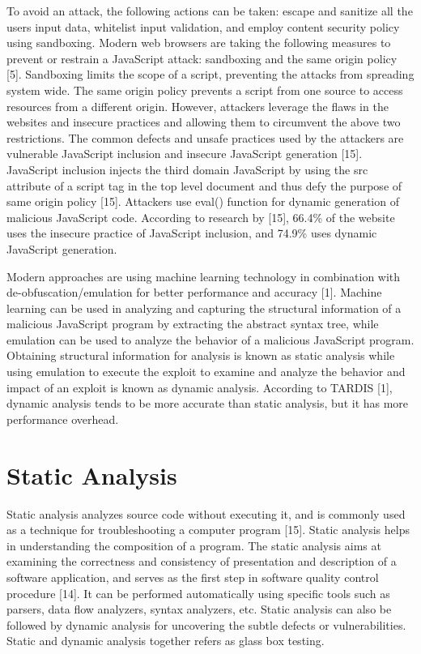 To avoid an attack, the following actions can be taken: escape and sanitize all the users input data, whitelist input validation, and employ content security policy using sandboxing. Modern web browsers are taking the following measures to prevent or restrain a JavaScript attack: sandboxing and the same origin policy [5]. Sandboxing limits the scope of a script, preventing the attacks from spreading system wide. The same origin policy prevents a script from one source to access resources from a different origin. However, attackers leverage the flaws in the websites and insecure practices and allowing them to circumvent the above two restrictions. The common defects and unsafe practices used by the attackers are vulnerable JavaScript inclusion and insecure JavaScript generation [15]. JavaScript inclusion injects the third domain JavaScript by using the src attribute of a script tag in the top level document and thus defy the purpose of same origin policy [15]. Attackers use eval() function for dynamic generation of malicious JavaScript code. According to research by [15], 66.4\% of the website uses the insecure practice of JavaScript inclusion, and 74.9\% uses dynamic JavaScript generation.

Modern approaches are using machine learning technology in combination with de-obfuscation/emulation for better performance and accuracy [1]. Machine learning can be used in analyzing and capturing the structural information of a malicious JavaScript program by extracting the abstract syntax tree, while emulation can be used to analyze the behavior of a malicious JavaScript program. Obtaining structural information for analysis is known as static analysis while using emulation to execute the exploit to examine and analyze the behavior and impact of an exploit is known as dynamic analysis. According to TARDIS [1], dynamic analysis tends to be more accurate than static analysis, but it has more performance overhead.  

\section{Static Analysis}

Static analysis analyzes source code without executing it, and is commonly used as a technique for troubleshooting a computer program [15]. Static analysis helps in understanding the composition of a program. The static analysis aims at examining the correctness and consistency of presentation and description of a software application, and serves as the first step in software quality control procedure [14]. It can be performed automatically using specific tools such as parsers, data flow analyzers, syntax analyzers, etc. Static analysis can also be followed by dynamic analysis for uncovering the subtle defects or vulnerabilities. Static and dynamic analysis together refers as glass box testing.


